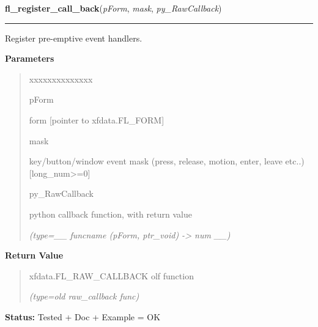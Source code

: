     \vspace{0.5ex}

\hspace{.8\funcindent}\begin{boxedminipage}{\funcwidth}

    \raggedright \textbf{fl\_register\_call\_back}(\textit{pForm}, \textit{mask}, \textit{py\_RawCallback})

    \vspace{-1.5ex}

    \rule{\textwidth}{0.5\fboxrule}
\setlength{\parskip}{2ex}
    Register pre-emptive event handlers.

\setlength{\parskip}{1ex}
      \textbf{Parameters}
      \vspace{-1ex}

      \begin{quote}
        \begin{Ventry}{xxxxxxxxxxxxxx}

          \item[pForm]

          form [pointer to xfdata.FL\_FORM]

          \item[mask]

          key/button/window event mask (press, release, motion, enter, 
          leave etc..) [long\_num{\textgreater}=0]

          \item[py\_RawCallback]

          python callback function, with return value

            {\it (type=\_\_ funcname (pForm, ptr\_void) -{\textgreater} num \_\_)}

        \end{Ventry}

      \end{quote}

      \textbf{Return Value}
    \vspace{-1ex}

      \begin{quote}
      xfdata.FL\_RAW\_CALLBACK olf function

      {\it (type=old raw\_callback func)}

      \end{quote}

\textbf{Status:} Tested + Doc + Example = OK



    \end{boxedminipage}

